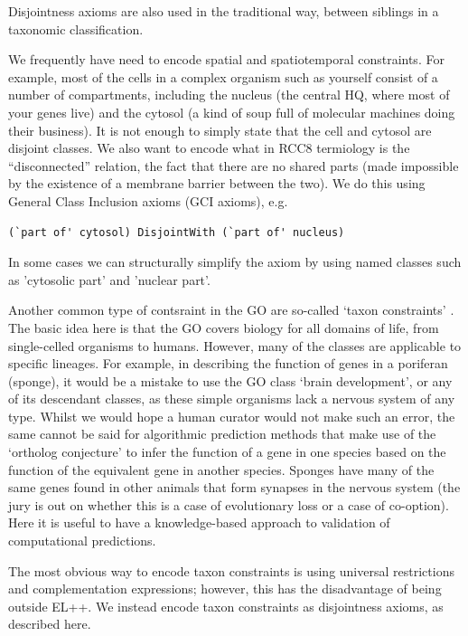 \documentclass{llncs}
\begin{document}
Disjointness axioms are also used in the traditional way, between
siblings in a taxonomic classification.

We frequently have need to encode spatial and spatiotemporal
constraints. For example, most of the cells in a complex organism such
as yourself consist of a number of compartments, including the nucleus
(the central HQ, where most of your genes live) and the cytosol (a
kind of soup full of molecular machines doing their business). It is
not enough to simply state that the cell and cytosol are disjoint
classes. We also want to encode what in RCC8 termiology is the
``disconnected'' relation, the fact that there are no shared parts
(made impossible by the existence of a membrane barrier between the
two). We do this using General Class Inclusion axioms (GCI axioms),
e.g.  

\begin{verbatim}
(`part of' cytosol) DisjointWith (`part of' nucleus)
\end{verbatim}

In some cases we can structurally simplify the axiom by using named
classes such as 'cytosolic part' and 'nuclear part'.

Another common type of contsraint in the GO are so-called `taxon
constraints' \cite{Deegan2010}. The basic idea here is that the GO
covers biology for all domains of life, from single-celled organisms
to humans. However, many of the classes are applicable to specific
lineages. For example, in describing the function of genes in a
poriferan (sponge), it would be a mistake to use the GO class ‘brain
development’, or any of its descendant classes, as these simple
organisms lack a nervous system of any type. Whilst we would hope a
human curator would not make such an error, the same cannot be said
for algorithmic prediction methods that make use of the `ortholog
conjecture'\cite{Thomas2012} to infer the function of a gene in one
species based on the function of the equivalent gene in another
species. Sponges have many of the same genes found in other animals
that form synapses in the nervous system (the jury is out on whether
this is a case of evolutionary loss or a case of co-option). Here it
is useful to have a knowledge-based approach to validation of
computational predictions.

The most obvious way to encode taxon constraints is using universal
restrictions and complementation expressions; however, this has the
disadvantage of being outside EL++. We instead encode taxon
constraints as disjointness axioms, as described here\cite{taxonOWL}.
\end{document}
